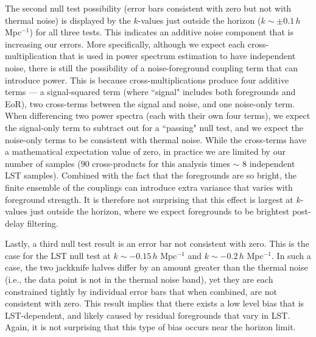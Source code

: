 \documentclass[preprint2,numberedappendix,tighten]{aastex6}  %
\begin{document}
The second null test possibility (error bars consistent with zero but not with thermal noise) is displayed by the $k$-values just outside the horizon ($k\sim\pm 0.1$\,$h$ Mpc$^{-1}$) for all three tests. This indicates an additive noise component that is increasing our errors. More specifically, although we expect each cross-multiplication that is used in power spectrum estimation to have independent noise, there is still the possibility of a noise-foreground coupling term that can introduce power. This is because cross-multiplications produce four additive terms --- a signal-squared term (where ``signal" includes both foregrounds and EoR), two cross-terms between the signal and noise, and one noise-only term. When differencing two power spectra (each with their own four terms), we expect the signal-only term to subtract out for a ``passing" null test, and we expect the noise-only terms to be consistent with thermal noise. While the cross-terms have a mathematical expectation value of zero, in practice we are limited by our number of samples ($90$ cross-products for this analysis times $\sim$ $8$ independent LST samples). Combined with the fact that the foregrounds are so bright, the finite ensemble of the couplings can introduce extra variance that varies with foreground strength. It is therefore not surprising that this effect is largest at $k$-values just outside the horizon, where we expect foregrounds to be brightest post-delay filtering.

Lastly, a third null test result is an error bar not consistent with zero. This is the case for the LST null test at $k\sim-0.15$\,$h$ Mpc$^{-1}$ and $k\sim-0.2$\,$h$ Mpc$^{-1}$. In such a case, the two jackknife halves differ by an amount greater than the thermal noise (i.e., the data point is not in the thermal noise band), yet they are each constrained tightly by individual error bars that when combined, are not consistent with zero. This result implies that there exists a low level bias that is LST-dependent, and likely caused by residual foregrounds that vary in LST. Again, it is not surprising that this type of bias occurs near the horizon limit.


\end{document}
